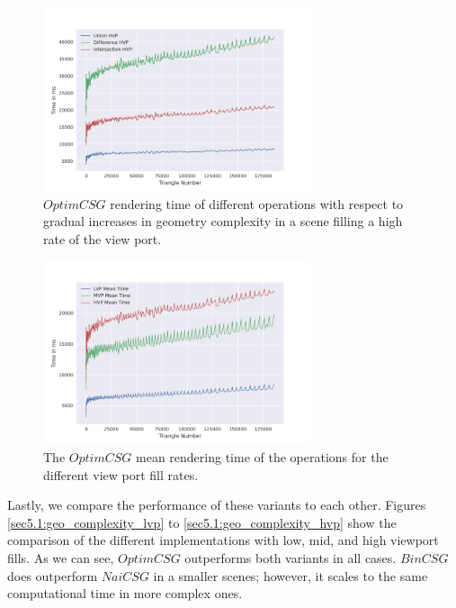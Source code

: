 \documentclass[a4paper,11pt,oneside]{article}
\begin{document}
\begin{figure}[H]
	\centering
	\includegraphics[width=0.7\textwidth]{section5/plots/optim_csg_hvp.png}
	\caption{$OptimCSG$ rendering time of different operations with respect to gradual increases in geometry complexity in a scene filling a high rate of the view port.}
	\label{sec5.1:optim_operations_hvp}
\end{figure}
\begin{figure}[H]
	\centering
	\includegraphics[width=0.7\textwidth]{section5/plots/optim_csg_mean.png}
	\caption{The $OptimCSG$ mean rendering time of the operations for the different view port fill rates.}
	\label{sec5.1:bin_operations}
\end{figure}

Lastly, we compare the performance of these variants to each other. Figures \ref{sec5.1:geo_complexity_lvp} to \ref{sec5.1:geo_complexity_hvp} show the comparison of the different implementations with low, mid, and high viewport fills. As we can see, $OptimCSG$ outperforms both variants in all cases. $BinCSG$ does outperform $NaiCSG$ in a smaller scenes; however, it scales to the same computational time in more complex ones.
\end{document}
